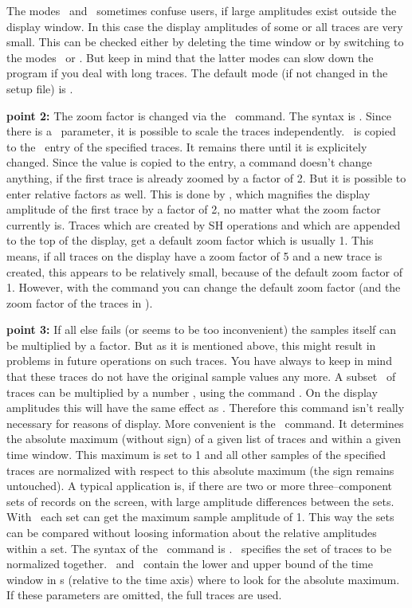 The modes \ and \ sometimes confuse users, if
large amplitudes exist outside the display window.  In this case
the display amplitudes of some or all traces are very small.
This can be checked either by deleting the time window or by
switching to the modes \ or .  But keep in mind
that the latter modes can slow down the program if you deal with
long traces.  The default mode (if not changed in the setup file)
is .
\smallskip

{\bf point 2:}
The zoom factor is changed via the \ command.  The syntax
is .  Since there is a \
parameter, it is possible to scale the traces independently.
\ is copied to the \ entry of the specified
traces.  It remains there until it is explicitely changed.
Since the value is copied to the entry, a command 
doesn't change anything, if the first trace is already zoomed
by a factor of 2.  But it is possible to enter relative factors
as well.  This is done by , which magnifies the
display amplitude of the first trace by a factor of 2, no
matter what the zoom factor currently is.  Traces which are created
by SH operations and which are appended to the top of the display,
get a default zoom factor which is usually 1.  This means, if all
traces on the display have a zoom factor of 5 and a new trace is
created, this appears to be relatively small, because of the default
zoom factor of 1.  However, with the command
 you can change the default zoom
factor (and the zoom factor of the traces in \exm{<list>}).

{\bf point 3:}
If all else fails (or seems to be too inconvenient) the samples
itself can be multiplied by a factor.  But as it is mentioned
above, this might result in problems in future operations on
such traces.  You have always to keep in mind that these traces
do not have the original sample values any more.  A subset
\ of traces can be multiplied by a number ,
using the command \cmd{trcfct <list> mul <r>}.  On the display
amplitudes this will have the same effect as
.  Therefore this command isn't really
necessary for reasons of display.  More convenient is the
\ command.  It determines the absolute maximum (without
sign) of a given list of traces and within a given time window.
This maximum is set to 1 and all other samples of the specified
traces are normalized with respect to this absolute maximum
(the sign remains untouched).  A typical application is, if there
are two or more three--component sets of records on the screen,
with large amplitude differences between the sets.  With
\ each set can get the maximum sample amplitude of 1.
This way the sets can be compared without loosing information
about the relative amplitudes within a set.  The syntax of the
\ command is .  \
specifies the set of traces to be normalized together.
\exm{<lo>}\ and \exm{<hi>}\ contain the lower and upper bound
of the time window in s (relative to the time axis) where to look
for the absolute maximum.  If these parameters are omitted, the
full traces are used.



